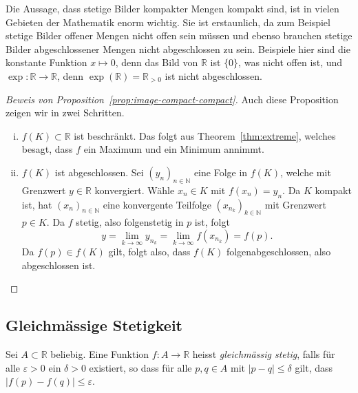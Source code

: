 \documentclass[../main.tex]{subfiles}
\begin{document}
\begin{remark}
  Die Aussage, dass stetige Bilder kompakter Mengen
  kompakt sind, ist in vielen Gebieten der Mathematik
  enorm
  wichtig. Sie ist erstaunlich, da
  zum Beispiel stetige Bilder offener Mengen
  nicht offen sein müssen
  und ebenso brauchen stetige Bilder abgeschlossener Mengen
  nicht abgeschlossen zu sein.
  Beispiele hier sind die konstante Funktion
  $x \mapsto 0$,
  denn das Bild von $\mathbb{R}$ ist $\{0\}$,
  was nicht offen ist,
  und $\exp \colon \mathbb{R} \to \mathbb{R}$,
  denn $\exp( \mathbb{R} ) = \mathbb{R}_{>0}$
  ist nicht abgeschlossen.
\end{remark}

\begin{proof}[Beweis von Proposition~\ref{prop:image-compact-compact}]
  Auch diese Proposition zeigen wir in zwei Schritten.
  \begin{enumerate}[(i)]
    \item $f(K) \subset \mathbb{R}$ ist beschränkt.
      Das folgt aus Theorem~\ref{thm:extreme},
      welches besagt,
      dass $f$ ein Maximum und ein Minimum annimmt.
    \item $f(K)$ ist abgeschlossen.
      Sei ${(y_{n})}_{n \in \mathbb{N}}$ eine
      Folge in $f(K)$, welche mit
      Grenzwert $y \in \mathbb{R}$ konvergiert.
      Wähle
      $x_n \in K$ mit $f(x_n) = y_n$.
      Da $K$ kompakt ist,
      hat ${(x_{n})}_{n \in \mathbb{N}}$ eine
      konvergente Teilfolge
      ${(x_{n_{k}})}_{k \in \mathbb{N}}$ 
      mit Grenzwert $p \in K$.
      Da $f$ stetig, also folgenstetig in $p$ ist,
      folgt
      \[
        y = \lim_{k \to \infty} y_{n_k} 
        = \lim_{k \to \infty} f(x_{n_k}) = f(p).
      \]
      Da $f(p) \in f(K)$ gilt, folgt also,
      dass $f(K)$ folgenabgeschlossen, also abgeschlossen
      ist. \qedhere
  \end{enumerate}
\end{proof}

\subsection*{Gleichmässige Stetigkeit}
\begin{definition}
  Sei $A \subset \mathbb{R}$ beliebig.
  Eine Funktion $f \colon A \to \mathbb{R}$ 
  heisst \emph{gleichmässig stetig},
  falls für alle $\varepsilon > 0$ 
  ein $\delta > 0$ 
  existiert, so dass für alle $p, q \in A$ 
  mit $|p - q| \leq \delta$ gilt,
  dass $|f(p) - f(q)| \leq \varepsilon$.
\end{definition}
\end{document}
